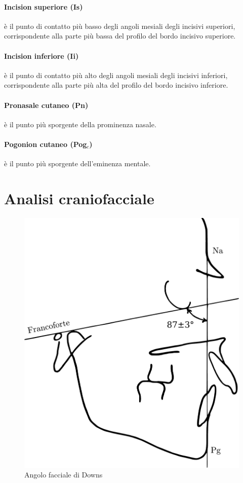 \paragraph{Incision superiore (Is)} è il punto di contatto più basso degli angoli mesiali degli incisivi superiori, corrispondente alla parte più bassa del profilo del bordo incisivo superiore.

\paragraph{Incision inferiore (Ii)} è il punto di contatto più alto degli angoli mesiali degli incisivi inferiori, corrispondente alla parte più alta del profilo del bordo incisivo inferiore.

\paragraph{Pronasale cutaneo (Pn)} è il punto più sporgente della prominenza nasale.

\paragraph{Pogonion cutaneo (Pog$_c$)} è il punto più sporgente dell'eminenza mentale.

\section{Analisi craniofacciale}

\begin{figure}[h!]
 \centering
 \includegraphics[width=.5\textwidth]{./images/ricketts_facciale_downs.pdf}
 \caption{Angolo facciale di Downs}
 \label{fig:ricketts_facciale_downs}
\end{figure}

